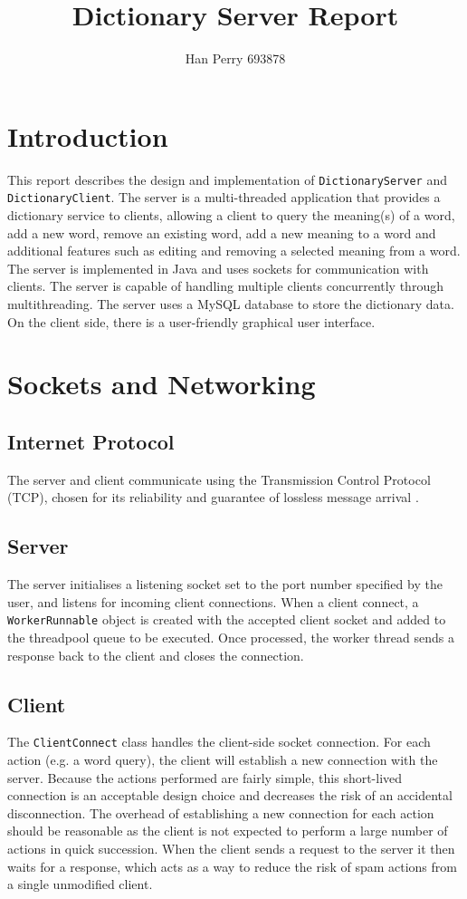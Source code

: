 \documentclass{article}
\title{Dictionary Server Report}
\author{Han Perry 693878}
\date{}
\begin{document}
\maketitle

\section*{Introduction}
This report describes the design and implementation of \texttt{DictionaryServer} and \texttt{DictionaryClient}. The server is a multi-threaded application that provides a dictionary service to clients, allowing a client to query the meaning(s) of a word, add a new word, remove an existing word, add a new meaning to a word and additional features such as editing and removing a selected meaning from a word. The server is implemented in Java and uses sockets for communication with clients. The server is capable of handling multiple clients concurrently through multithreading. The server uses a MySQL database to store the dictionary data. On the client side, there is a user-friendly graphical user interface.


\section*{Sockets and Networking}

\subsection*{Internet Protocol}
The server and client communicate using the Transmission Control Protocol (TCP), chosen for its reliability and guarantee of lossless message arrival \cite{tcp-rfc}.

\subsection*{Server}
The server initialises a listening socket set to the port number specified by the user, and listens for incoming client connections. When a client connect, a \texttt{WorkerRunnable} object is created with the accepted client socket and added to the threadpool queue to be executed. Once processed, the worker thread sends a response back to the client and closes the connection.

\subsection*{Client}
The \texttt{ClientConnect} class handles the client-side socket connection. For each action (e.g. a word query), the client will establish a new connection with the server. Because the actions performed are fairly simple, this short-lived connection is an acceptable design choice and decreases the risk of an accidental disconnection. The overhead of establishing a new connection for each action should be reasonable as the client is not expected to perform a large number of actions in quick succession. When the client sends a request to the server it then waits for a response, which acts as a way to reduce the risk of spam actions from a single unmodified client.
\end{document}
